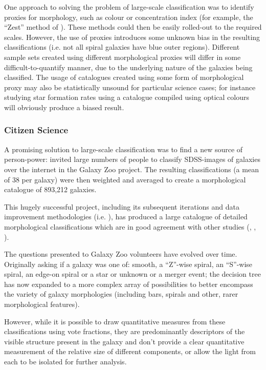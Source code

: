 \documentclass[../main.tex]{subfiles}
\begin{document}
One approach to solving the problem of large-scale classification was to identify proxies for morphology, such as colour or concentration index (for example, the ``Zest'' method of  \citet{Scarlata2007:astro-ph/0701746v2}). These methods could then be easily rolled-out to the required scales. However, the use of proxies introduces some unknown bias in the resulting classifications (i.e. not all spiral galaxies have blue outer regions). Different sample sets created using different morphological proxies will differ in some difficult-to-quantify manner, due to the underlying nature of the galaxies being classified. The usage of catalogues created using some form of morphological proxy may also be statistically unsound for particular science cases; for instance studying star formation rates using a catalogue compiled using optical colours will obviously produce a biased result.

\subsubsection{Citizen Science}
A promising solution to large-scale classification was to find a new source of person-power: \cite{Lintott2008:0804.4483v1} invited large numbers of people to classify SDSS-images of galaxies over the internet in the Galaxy Zoo project. The resulting classifications (a mean of 38 per galaxy) were then weighted and averaged to create a morphological catalogue of 893,212 galaxies.

This hugely successful project, including its subsequent iterations and data improvement methodologies (i.e. \citealt{Hart2016:1607.01019v1}), has produced a large catalogue of detailed morphological classifications which are in good agreement with other studies (\citealt{Willett2013:1308.3496v2}, \citealt{Simmons2014:1409.1214v1}, \citealt{Willett2016:1610.03068v2}).

The questions presented to Galaxy Zoo volunteers have evolved over time. Originally asking if a galaxy was one of: smooth, a ``Z''-wise spiral, an ``S''-wise spiral, an edge-on spiral or a star or unknown or a merger event; the decision tree has now expanded to a more complex array of possibilities to better encompass the variety of galaxy morphologies (including bars, spirals and other, rarer morphological features).

However, while it is possible to draw quantitative measures from these classifications using vote fractions, they are predominantly descriptors of the visible structure present in the galaxy and don't provide a clear quantitative measurement of the relative size of different components, or allow the light from each to be isolated for further analysis.
\end{document}
